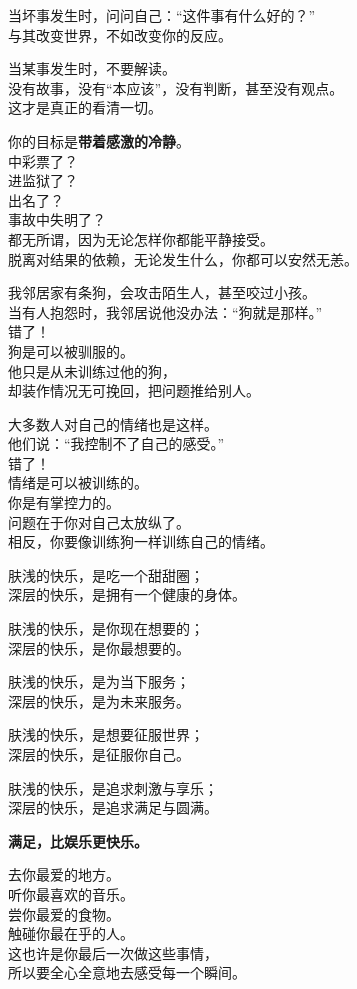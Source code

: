 \documentclass[
]{article}
\begin{document}
当坏事发生时，问问自己：``这件事有什么好的？''\\
与其改变世界，不如改变你的反应。

当某事发生时，不要解读。\\
没有故事，没有``本应该''，没有判断，甚至没有观点。\\
这才是真正的看清一切。

你的目标是\textbf{带着感激的冷静}。\\
中彩票了？\\
进监狱了？\\
出名了？\\
事故中失明了？\\
都无所谓，因为无论怎样你都能平静接受。\\
脱离对结果的依赖，无论发生什么，你都可以安然无恙。

我邻居家有条狗，会攻击陌生人，甚至咬过小孩。\\
当有人抱怨时，我邻居说他没办法：``狗就是那样。''\\
错了！\\
狗是可以被驯服的。\\
他只是从未训练过他的狗，\\
却装作情况无可挽回，把问题推给别人。

大多数人对自己的情绪也是这样。\\
他们说：``我控制不了自己的感受。''\\
错了！\\
情绪是可以被训练的。\\
你是有掌控力的。\\
问题在于你对自己太放纵了。\\
相反，你要像训练狗一样训练自己的情绪。

肤浅的快乐，是吃一个甜甜圈；\\
深层的快乐，是拥有一个健康的身体。

肤浅的快乐，是你现在想要的；\\
深层的快乐，是你最想要的。

肤浅的快乐，是为当下服务；\\
深层的快乐，是为未来服务。

肤浅的快乐，是想要征服世界；\\
深层的快乐，是征服你自己。

肤浅的快乐，是追求刺激与享乐；\\
深层的快乐，是追求满足与圆满。

\textbf{满足，比娱乐更快乐。}

去你最爱的地方。\\
听你最喜欢的音乐。\\
尝你最爱的食物。\\
触碰你最在乎的人。\\
这也许是你最后一次做这些事情，\\
所以要全心全意地去感受每一个瞬间。
\end{document}
